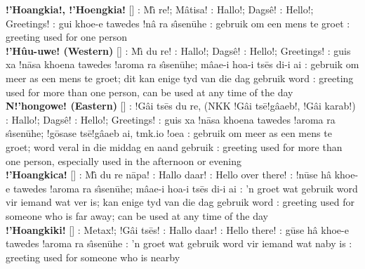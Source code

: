 \textbf{!'Hoangkia!, !'Hoengkia!}
[] : M\^{\i} re!;
M\^{a}tisa! : Hallo!; Dags\^{e}! : Hello!;
Greetings! : \textvertline{}gui khoe-e tawedes !n\^{a}
ra s\^{\i}sen\={u}he : gebruik om een mens te groet
: greeting used for one person \\

\textbf{!'H\^{u}u-uwe! (Western)}
[] : M\^{\i}
du re! : Hallo!; Dags\^{e}! : Hello!;
Greetings! : \textvertline{}guis xa !n\={a}sa khoena
tawedes !aroma ra s\^{\i}sen\={u}he; m\^{a}\textdoublevertline{}ae-i
hoa-i ts\={e}s di-i ai : gebruik om meer as een mens te
groet; dit kan enige tyd van die dag gebruik word :
greeting used for more than one person, can be used at any time of the
day \\

\textbf{N!'hongowe! (Eastern)} []
: !G\^{a}i ts\={e}s du re, (NKK !G\^{a}i
ts\={e}!g\^{a}\textdoublevertline{}aeb!, !G\^{a}i karab!)
: Hallo!; Dags\^{e}! : Hello!; Greetings!
: \textvertline{}guis xa !n\={a}sa khoena tawedes
!aroma ra s\^{\i}sen\={u}he; !g\={o}sase
ts\={e}!g\^{a}\textdoublevertline{}aeb ai, tmk.io !oea :
gebruik om meer as een mens te groet; word veral in die middag en aand
gebruik : greeting used for more than one person,
especially used in the afternoon or evening \\

\textbf{!'Hoangkica!} []
: M\^{\i} du re \textdoublevertline{}n\={a}pa!
: Hallo daar! : Hello over there!
: !n\={u}se h\^{a} khoe-e tawedes !aroma ra
s\^{\i}sen\={u}he; m\^{a}\textdoublevertline{}ae-i hoa-i ts\={e}s di-i
ai : 'n groet wat gebruik word vir iemand wat ver is;
kan enige tyd van die dag gebruik word : greeting used
for someone who is far away; can be used at any time of the day \\

\textbf{!'Hoangkiki!} [] : Metax!; !G\^{a}i
ts\={e}s! : Hallo daar! : Hello there!
: \textvertline{}g\={u}se h\^{a} khoe-e tawedes !aroma
ra s\^{\i}sen\={u}he : 'n groet wat gebruik word vir
iemand wat naby is : greeting used for someone who is
nearby \\

